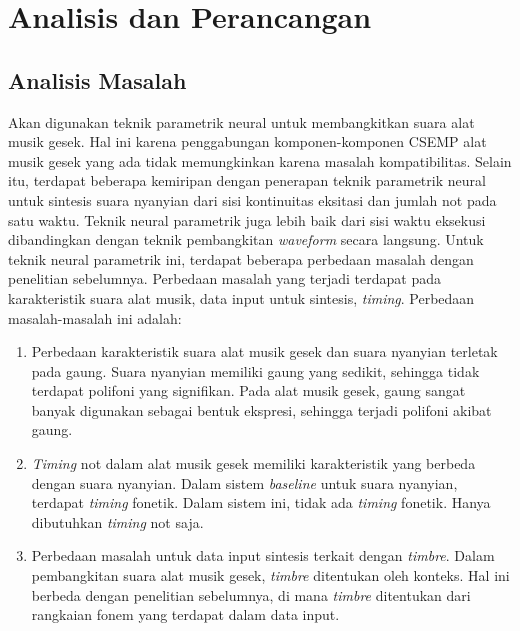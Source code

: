 \chapter{Analisis dan Perancangan} \label{design-chapter}

\section{Analisis Masalah}\label{section-problem-analysis}

Akan digunakan teknik parametrik neural untuk membangkitkan suara alat musik gesek. Hal ini karena penggabungan komponen-komponen CSEMP alat musik gesek yang ada tidak memungkinkan karena masalah kompatibilitas. Selain itu, terdapat beberapa kemiripan dengan penerapan teknik parametrik neural untuk sintesis suara nyanyian dari sisi kontinuitas eksitasi dan jumlah not pada satu waktu. Teknik neural parametrik juga lebih baik dari sisi waktu eksekusi dibandingkan dengan teknik pembangkitan \textit{waveform} secara langsung. Untuk teknik neural parametrik ini, terdapat beberapa perbedaan masalah dengan penelitian sebelumnya\parencite{bonada2017singing}. Perbedaan masalah yang terjadi terdapat pada karakteristik suara alat musik, data input untuk sintesis, \textit{timing}. Perbedaan masalah-masalah ini adalah:

\begin{enumerate}

\item Perbedaan karakteristik suara alat musik gesek dan suara nyanyian terletak pada gaung. Suara nyanyian memiliki gaung yang sedikit, sehingga tidak terdapat polifoni yang signifikan. Pada alat musik gesek, gaung sangat banyak digunakan sebagai bentuk ekspresi, sehingga terjadi polifoni akibat gaung.

\item \textit{Timing} not dalam alat musik gesek memiliki karakteristik yang berbeda dengan suara nyanyian. Dalam sistem \textit{baseline} untuk suara nyanyian, terdapat \textit{timing} fonetik. Dalam sistem ini, tidak ada \textit{timing} fonetik. Hanya dibutuhkan \textit{timing} not saja.

\item Perbedaan masalah untuk data input sintesis terkait dengan \textit{timbre}. Dalam pembangkitan suara alat musik gesek, \textit{timbre} ditentukan oleh konteks. Hal ini berbeda dengan penelitian sebelumnya, di mana \textit{timbre} ditentukan dari rangkaian fonem yang terdapat dalam data input.


\end{enumerate}

